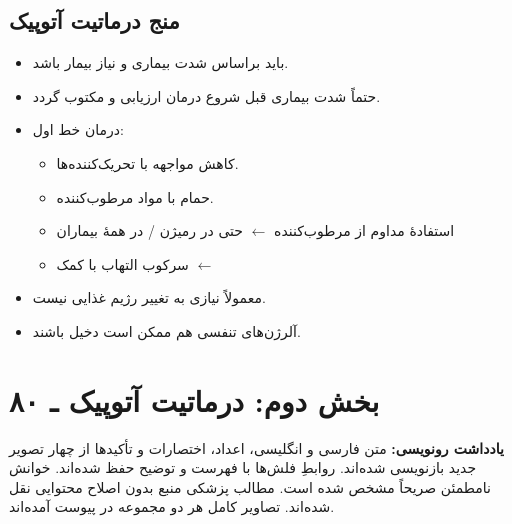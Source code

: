 \documentclass[12pt,a4paper]{article}
\begin{document}
\subsection*{منج درماتیت آتوپیک}
\begin{itemize}
  \item باید براساس شدت بیماری و نیاز بیمار باشد.
  \item حتماً شدت بیماری قبل شروع درمان ارزیابی و مکتوب گردد.
  \item درمان خط اول:
  \begin{itemize}
    \item کاهش مواجهه با تحریک‌کننده‌ها.
    \item حمام با مواد مرطوب‌کننده.
    \item استفادهٔ مداوم از مرطوب‌کننده $\leftarrow$ حتی در رمیژن / در همهٔ بیماران \Atopiccut
    \item سرکوب التهاب با کمک  $\leftarrow$  \Atopiccut
  \end{itemize}
  \item معمولاً نیازی به تغییر رژیم غذایی نیست.
  \item آلرژن‌های تنفسی هم ممکن است دخیل باشند.
\end{itemize}


\clearpage
\section*{بخش دوم: درماتیت آتوپیک ـ ۸۰}
\textbf{یادداشت رونویسی:} متن فارسی و انگلیسی، اعداد، اختصارات و تأکیدها از چهار تصویر جدید بازنویسی شده‌اند. روابطِ فلش‌ها با فهرست و توضیح حفظ شده‌اند. خوانش نامطمئن صریحاً مشخص شده است. مطالب پزشکی منبع بدون اصلاح محتوایی نقل شده‌اند. تصاویر کامل هر دو مجموعه در پیوست آمده‌اند.

\newcommand{\PADrange}[2]{\lr{#1--#2}}
\newcommand{\PADunclear}[1]{\textcolor{red!65!black}{[خوانش نامطمئن: #1]}}
\newcommand{\PADheader}[2]{\section*{تصویر جدید #1}\textbf{سربرگ و حاشیه:}
\lr{Subject:} #2؛ \lr{Year:}، \lr{Month:}، \lr{Date:} (خالی)؛
شماره‌های چاپی کنار سطرها: ۱، ۲، ۳، ۴، ۵، ۶، ۷، ۸، ۹؛ شمارهٔ دست‌نویس پایین صفحه: #1.\par}
\end{document}
